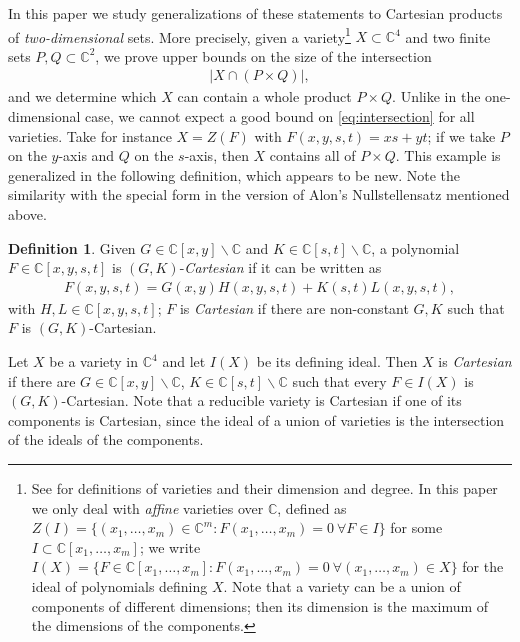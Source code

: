\documentclass{daj}
\theoremstyle{definition}
\newtheorem{definition}[theorem]{Definition}
\newcommand{\C}{\mathbb C}
\begin{document}
In this paper we study generalizations of these statements to Cartesian products of \emph{two-dimensional} sets.
More precisely, given a variety\footnote{See \cite{CLOS, Shaf} for definitions of varieties and their dimension and degree. In this paper we only deal with \emph{affine} varieties over $\C$, defined as $Z(I)=\{(x_1,\ldots,x_m)\in \C^m:F(x_1,\ldots,x_m)=0~\forall F\in I\}$ for some $I\subset \C[x_1,\ldots,x_m]$;
we write $I(X) = \{F\in \C[x_1,\ldots,x_m]: F(x_1,\ldots,x_m)=0~\forall (x_1,\ldots,x_m)\in X\}$ for the ideal of polynomials defining $X$.
Note that a variety can be a union of components of different dimensions; then its dimension is the maximum of the dimensions of the components.} $X\subset \C^4$ and two finite sets $P,Q\subset \C^2$, we prove upper bounds on the size of the intersection
\begin{align}\label{eq:intersection}
|X\cap (P\times Q)|,
\end{align}
and we determine which $X$ can contain a whole product $P\times Q$.
Unlike in the one-dimensional case, we cannot expect a good bound on \eqref{eq:intersection} for all varieties. 
Take for instance $X = Z(F)$ with $F(x,y,s,t)=xs+yt$; if we take $P$ on the $y$-axis and $Q$ on the $s$-axis, then $X$ contains all of $P\times Q$.
This example is generalized in the following definition, which appears to be new.
Note the similarity with the special form in the version of Alon's Nullstellensatz mentioned above.

\begin{definition}\label{def:cartesian}
Given $G\in \C[x,y]\backslash\C$ and $K\in \C[s,t]\backslash\C$,
a polynomial $F\in \C[x,y,s,t]$ is $(G,K)$-\emph{Cartesian} if it can be written as
\begin{align}\label{eq:cartesian}
F(x,y,s,t) = G(x,y)H(x,y,s,t)+ K(s,t)L(x,y,s,t),
\end{align}
with $H,L\in \C[x,y,s,t] $;
$F$ is \emph{Cartesian} if there are non-constant $G,K$ such that $F$ is $(G,K)$-Cartesian.

Let $X$ be a variety in $\C^4$ and let $I(X)$ be its defining ideal.
Then $X$ is \emph{Cartesian} if there are $G\in \C[x,y]\backslash\C$, $K\in \C[s,t]\backslash\C$ such that every $F\in I(X)$ is $(G,K)$-Cartesian.
Note that a reducible variety is Cartesian if  one of its components is Cartesian, since the ideal of a union of varieties is the intersection of the ideals of the components.
\end{definition}
\end{document}
